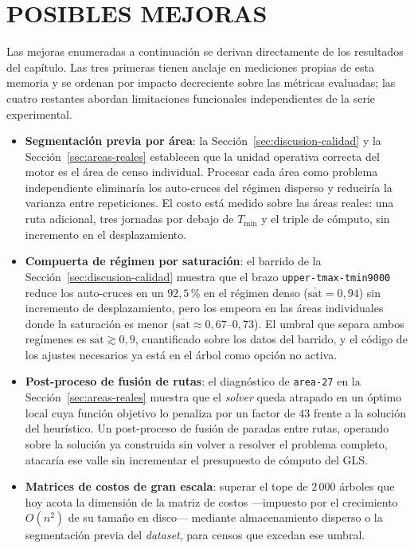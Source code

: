 \section{POSIBLES MEJORAS}
\label{sec:posibles-mejoras}

Las mejoras enumeradas a continuación se derivan directamente de los resultados
del capítulo. Las tres primeras tienen anclaje en mediciones propias de esta
memoria y se ordenan por impacto decreciente sobre las métricas evaluadas; las
cuatro restantes abordan limitaciones funcionales independientes de la serie
experimental.

\begin{itemize}
  \item \textbf{Segmentación previa por área}: la
  Sección~\ref{sec:discusion-calidad} y la Sección~\ref{sec:areas-reales}
  establecen que la unidad operativa correcta del motor es el área de censo
  individual. Procesar cada área como problema independiente eliminaría los
  auto-cruces del régimen disperso y reduciría la varianza entre repeticiones.
  El costo está medido sobre las áreas reales: una ruta adicional, tres jornadas
  por debajo de $T_{\min}$ y el triple de cómputo, sin incremento en el
  desplazamiento.

  \item \textbf{Compuerta de régimen por saturación}: el barrido de la
  Sección~\ref{sec:discusion-calidad} muestra que el brazo
  \texttt{upper-tmax-tmin9000} reduce los auto-cruces en un $92{,}5$\,\% en el
  régimen denso ($\overline{\text{sat}} = 0{,}94$) sin incremento de
  desplazamiento, pero los empeora en las áreas individuales donde la saturación
  es menor ($\overline{\text{sat}} \approx 0{,}67$--$0{,}73$). El umbral que
  separa ambos regímenes es $\overline{\text{sat}} \gtrsim 0{,}9$, cuantificado
  sobre los datos del barrido, y el código de los ajustes necesarios ya está en
  el árbol como opción no activa.

  \item \textbf{Post-proceso de fusión de rutas}: el diagnóstico de
  \texttt{area-27} en la Sección~\ref{sec:areas-reales} muestra que el
  \textit{solver} queda atrapado en un óptimo local cuya función objetivo lo
  penaliza por un factor de $43$ frente a la solución del heurístico. Un
  post-proceso de fusión de paradas entre rutas, operando sobre la solución ya
  construida sin volver a resolver el problema completo, atacaría ese valle sin
  incrementar el presupuesto de cómputo del GLS.

  \item \textbf{Matrices de costos de gran escala}: superar el tope de
  $2\,000$ árboles que hoy acota la dimensión de la matriz de costos ---impuesto
  por el crecimiento $O(n^2)$ de su tamaño en disco--- mediante almacenamiento
  disperso o la segmentación previa del \textit{dataset}, para censos que
  excedan ese umbral.


\end{itemize}
